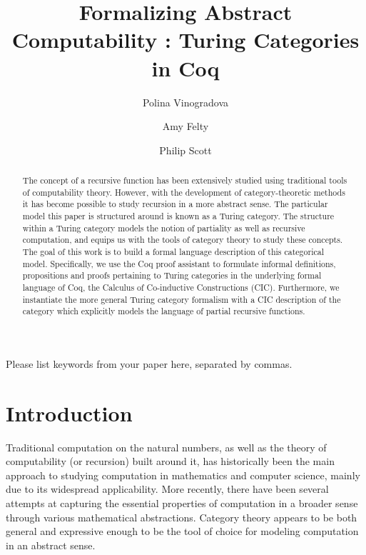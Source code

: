 \documentclass{entcs} \usepackage{entcsmacro}
\begin{document}
\begin{frontmatter}
  \title{Formalizing Abstract Computability : Turing Categories in Coq} 
  \author{Polina Vinogradova}
  \address{Electrical Engineering and Computer Science\\ University of Ottawa\\
    Ottawa, Canada} 
 \author{Amy Felty}
  \address{Electrical Engineering and Computer Science\\University of Ottawa\\
    Ottawa, Canada} 
 \author{Philip Scott}
  \address{Mathematics and Statistics\\ University of Ottawa\\
    Ottawa, Canada} 

\begin{abstract} 
  	The concept of a recursive function has been extensively studied using traditional tools of computability theory. However, with the development of category-theoretic methods it has become possible to study recursion in a more abstract sense. The particular model this paper is structured around is known as a Turing category. The structure within a Turing category models the notion of partiality as well as recursive computation, and equips us with the tools of category theory to study these concepts. The goal of this work is to build a formal language description of this categorical model. Specifically, we use the Coq proof assistant to formulate informal definitions, propositions and proofs pertaining to Turing categories in the underlying formal language of Coq, the Calculus of Co-inductive Constructions (CIC). Furthermore, we instantiate the more general Turing category formalism with a CIC description of the category which explicitly models the language of partial recursive functions.
\end{abstract}
\begin{keyword}
  Please list keywords from your paper here, separated by commas.
\end{keyword}
\end{frontmatter}
\section{Introduction}\label{intro}
Traditional computation on the natural numbers, as well as the theory of computability (or recursion) built around it, 
has historically been the main approach to studying computation in mathematics and computer science, mainly due to its widespread applicability. More recently, there have been several attempts at capturing the essential properties of computation in a broader sense through various mathematical abstractions. Category theory appears to be both general and expressive enough to be the tool of choice for modeling computation in an abstract sense. 
\end{document}
